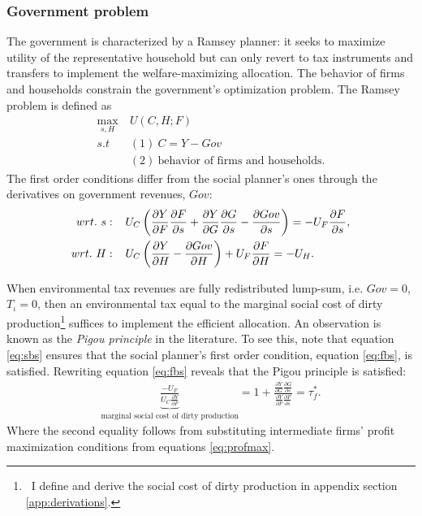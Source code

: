 \subsubsection{Government problem}\label{subsec:Rams}
The government is characterized by a Ramsey planner: it seeks to maximize utility of the representative household but can only revert to tax instruments and transfers to implement the welfare-maximizing allocation. The behavior of firms and households constrain the government's optimization problem. 
The Ramsey problem is defined as
\begin{align}
\underset{s, H}{\max}\ & U(C,H; F)\\ s.t\ \ & (1)\  C=Y-Gov\\ & (2) \ \text{behavior of firms and households}.
\end{align}
The first order conditions differ from the social planner's ones through the derivatives on government revenues, $Gov$:
\begin{align}
wrt.\ s:\hspace{4mm} & U_C\left(\frac{\partial Y}{\partial F}\frac{\partial F}{\partial s}+\frac{\partial Y}{\partial G}\frac{\partial G}{\partial s}-\frac{\partial Gov}{ \partial s}\right)=-U_F\frac{\partial F}{\partial s}, \label{eq:sbs}
\\
wrt.\ H:\hspace{4mm} & U_C\left(\frac{\partial Y}{\partial H}-\frac{\partial Gov}{\partial H}\right)+U_F\frac{\partial F}{\partial H}=-U_H\label{eq:sbh}. 
\end{align}

When environmental tax revenues are fully redistributed lump-sum, i.e. $Gov=0$, $T_\iota=0$, then an environmental tax equal to the marginal social cost of dirty production\footnote{\ I define and derive the social cost of dirty production in appendix section \ref{app:derivations}.} suffices to implement the efficient allocation. An observation is known as the \textit{Pigou principle} in the literature. 
To see this, note that equation \ref{eq:sbs} ensures that the social planner's first order condition, equation \ref{eq:fbs}, is satisfied. 
Rewriting equation \ref{eq:fbs} reveals that the Pigou principle is satisfied: %
\begin{align}
\underbrace{\frac{-U_F}{U_C\frac{\partial Y}{\partial F}}}_{\text{marginal social cost of dirty production}}=1+\frac{\frac{\partial Y}{\partial G}\frac{\partial G}{\partial s}}{\frac{\partial Y}{\partial F}\frac{\partial F}{\partial s}}=\tau^*_f.
\end{align}
Where the second equality follows from substituting intermediate firms' profit maximization conditions from equations \ref{eq:profmax}. 

